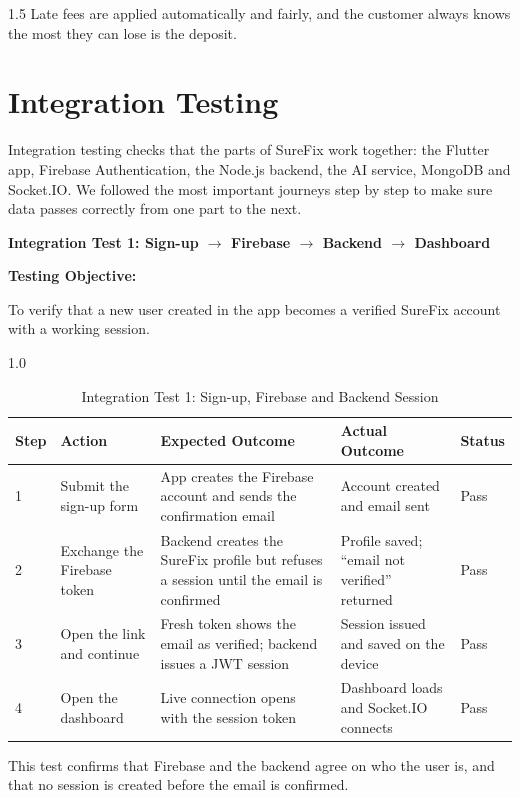 \documentclass[A4paper,12pt]{report}
\theoremstyle{plain}
\theoremstyle{definition}
\theoremstyle{remark}
\numberwithin{equation}{section}
\begin{document}
\begin{spacing}{1.5}
Late fees are applied automatically and fairly, and the customer always knows the most they can lose is the deposit.

\section{Integration Testing}

Integration testing checks that the parts of SureFix work together: the Flutter app, Firebase Authentication, the Node.js backend, the AI service, MongoDB and Socket.IO. We followed the most important journeys step by step to make sure data passes correctly from one part to the next.

\textbf{Integration Test 1: Sign-up $\rightarrow$ Firebase $\rightarrow$ Backend $\rightarrow$ Dashboard}

\textbf{Testing Objective:}

To verify that a new user created in the app becomes a verified SureFix account with a working session.

\begin{table}[H]
\centering
\caption{Integration Test 1: Sign-up, Firebase and Backend Session}
\begin{spacing}{1.0}
{\small
\begin{tabular}{|p{}|p{}|p{}|p{}|p{}|}
\hline
\textbf{Step} & \textbf{Action} & \textbf{Expected Outcome} & \textbf{Actual Outcome} & \textbf{Status} \\ \hline
1 & Submit the sign-up form & App creates the Firebase account and sends the confirmation email & Account created and email sent & Pass \\ \hline
2 & Exchange the Firebase token & Backend creates the SureFix profile but refuses a session until the email is confirmed & Profile saved; ``email not verified'' returned & Pass \\ \hline
3 & Open the link and continue & Fresh token shows the email as verified; backend issues a JWT session & Session issued and saved on the device & Pass \\ \hline
4 & Open the dashboard & Live connection opens with the session token & Dashboard loads and Socket.IO connects & Pass \\ \hline
\end{tabular}}
\end{spacing}
\end{table}

This test confirms that Firebase and the backend agree on who the user is, and that no session is created before the email is confirmed.


\end{spacing}
\end{document}
